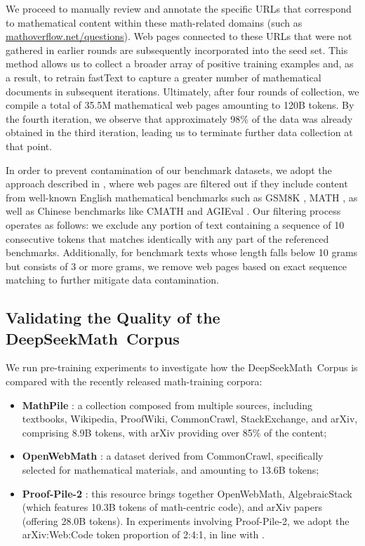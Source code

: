 \begin{itemize}[topsep=0pt]
We proceed to manually review and annotate the specific URLs that correspond to mathematical content within these math-related domains (such as \url{mathoverflow.net/questions}). Web pages connected to these URLs that were not gathered in earlier rounds are subsequently incorporated into the seed set. This method allows us to collect a broader array of positive training examples and, as a result, to retrain fastText to capture a greater number of mathematical documents in subsequent iterations. Ultimately, after four rounds of collection, we compile a total of 35.5M mathematical web pages amounting to 120B tokens. By the fourth iteration, we observe that approximately 98\% of the data was already obtained in the third iteration, leading us to terminate further data collection at that point.

In order to prevent contamination of our benchmark datasets, we adopt the approach described in \cite{deepseek-coder}, where web pages are filtered out if they include content from well-known English mathematical benchmarks such as GSM8K \citep{gsm8k}, MATH \citep{MATH}, as well as Chinese benchmarks like CMATH \citep{wei2023cmath} and AGIEval \citep{agieval}. Our filtering process operates as follows: we exclude any portion of text containing a sequence of 10 consecutive tokens that matches identically with any part of the referenced benchmarks. Additionally, for benchmark texts whose length falls below 10 grams but consists of 3 or more grams, we remove web pages based on exact sequence matching to further mitigate data contamination.

\subsection{Validating the Quality of the DeepSeekMath~Corpus}

We run pre-training experiments to investigate how the DeepSeekMath~Corpus is compared with the recently released math-training corpora:

\begin{itemize}[topsep=0pt]
    \item \textbf{MathPile} \citep{mathpile}: a collection composed from multiple sources, including textbooks, Wikipedia, ProofWiki, CommonCrawl, StackExchange, and arXiv, comprising 8.9B tokens, with arXiv providing over 85\% of the content;
    \item \textbf{OpenWebMath} \citep{openwebmath}: a dataset derived from CommonCrawl, specifically selected for mathematical materials, and amounting to 13.6B tokens;
    \item \textbf{Proof-Pile-2} \citep{llemma}: this resource brings together OpenWebMath, AlgebraicStack (which features 10.3B tokens of math-centric code), and arXiv papers (offering 28.0B tokens). In experiments involving Proof-Pile-2, we adopt the arXiv:Web:Code token proportion of 2:4:1, in line with \cite{llemma}.
\end{itemize}


\end{itemize}
